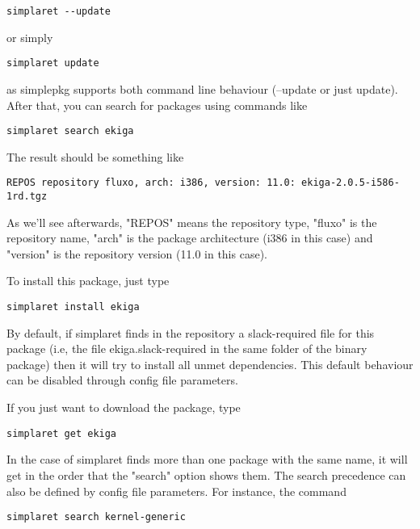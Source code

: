\documentclass{article}
\begin{document}
\begin{verbatim}
simplaret --update
\end{verbatim}

or simply 

\begin{verbatim}
simplaret update
\end{verbatim}

as simplepkg supports both command line behaviour (--update or just update). After that, you can search for packages using commands like

\begin{verbatim}
simplaret search ekiga
\end{verbatim}

The result should be something like
  
\begin{verbatim}
REPOS repository fluxo, arch: i386, version: 11.0: ekiga-2.0.5-i586-1rd.tgz
\end{verbatim}

As we'll see afterwards, "REPOS" means the repository type, "fluxo" is the repository name, "arch" is the package architecture (i386 in this case) and "version" is the repository version (11.0 in this case).

To install this package, just type

\begin{verbatim}
simplaret install ekiga
\end{verbatim}

By default, if simplaret finds in the repository a slack-required file for this package (i.e, the file ekiga.slack-required in the same folder of the binary package) then it will try to install all unmet dependencies. This default behaviour can be disabled through config file parameters.

If you just want to download the package, type

\begin{verbatim}
simplaret get ekiga
\end{verbatim}

In the case of simplaret finds more than one package with the same name, it will get in the order that the "search" option shows them. The search precedence can also be defined by config file parameters. For instance, the command

\begin{verbatim}
simplaret search kernel-generic
\end{verbatim}
\end{document}
